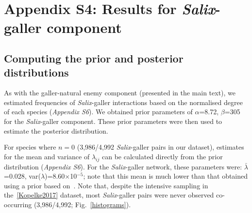 \documentclass[12pt]{article}
\begin{document}
\clearpage

\section*{Appendix S4: Results for \emph{Salix}-galler component}

    \subsection*{Computing the prior and posterior distributions}

      As with the galler-natural enemy component (presented in the main text), we estimated frequencies of \emph{Salix}-galler interactions based on the normalised degree of each species (\emph{Appendix S6}). We obtained prior parameters of $\alpha$=8.72, $\beta$=305 for the \emph{Salix}-galler component. These prior parameters were then used to estimate the posterior distribution. 


      For species where $n=0$ (3,986/4,992 \emph{Salix}-galler pairs in our dataset), estimates for the mean and variance of $\lambda_{ij}$ can be calculated directly from the prior distribution (\emph{Appendix S6}). For the \emph{Salix}-galler network, these parameters were: $\bar\lambda$=0.028, var($\lambda$)=8.60$\times$10$^{-5}$; note that this mean is much lower than that obtained using a prior based on~\citet[Data available from the Dryad Digital Repository: https://doi.org/10.5061/dryad.g7805]{Barbour2016}. Note that, despite the intensive sampling in the~\ref{Kopelke2017} dataset, most \emph{Salix}-galler pairs were never observed co-occurring (3,986/4,992; Fig.~\ref{histograms}).
\end{document}
